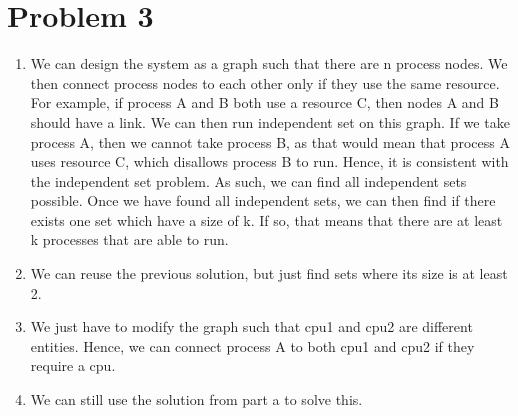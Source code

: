 \documentclass[12pt,letterpaper]{article}
\begin{document}
\section*{Problem 3}

\begin{enumerate}
  \item 
    We can design the system as a graph such that there are n process nodes.
    We then connect process nodes to each other only if they use the same resource.
    For example, if process A and B both use a resource C, then nodes A and B should have a link.
    We can then run independent set on this graph.
    If we take process A, then we cannot take process B, 
    as that would mean that process A uses resource C, 
    which disallows process B to run.
    Hence, it is consistent with the independent set problem.
    As such, we can find all independent sets possible.
    Once we have found all independent sets, we can then find if there exists one set which have a size of k.
    If so, that means that there are at least k processes that are able to run.
  \item 
    We can reuse the previous solution, but just find sets where its size is at least 2.
  \item
    We just have to modify the graph such that cpu1 and cpu2 are different entities.
    Hence, we can connect process A to both cpu1 and cpu2 if they require a cpu.
  \item 
    We can still use the solution from part a to solve this.
\end{enumerate}
\end{document}
